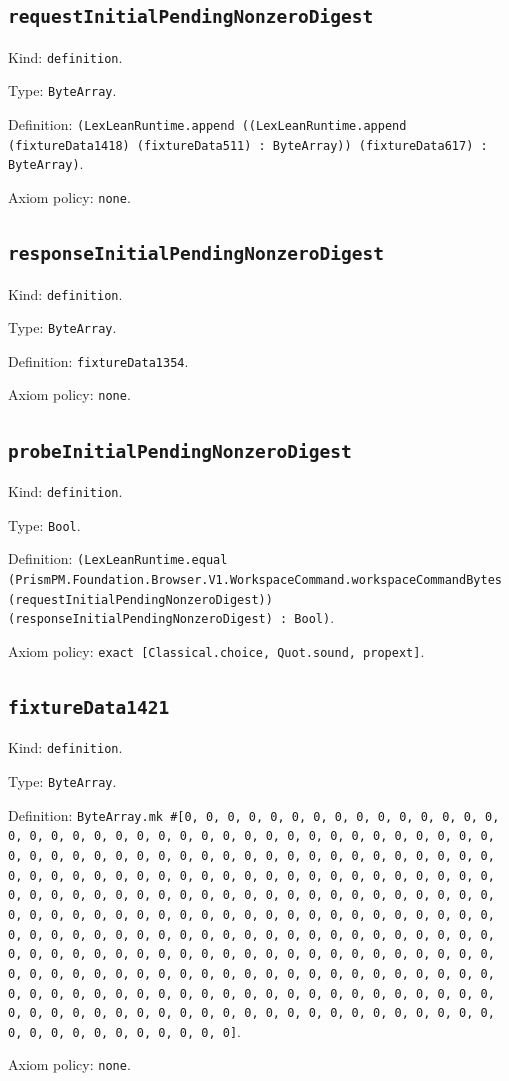 \documentclass[11pt]{article}
\begin{document}
\subsection*{\texttt{requestInitialPendingNonzeroDigest}}
\noindent Kind: \texttt{definition}.\par
\noindent Type: \texttt{ByteArray}.\par
\noindent Definition: \texttt{(LexLeanRuntime.append ((LexLeanRuntime.append (fixtureData1418) (fixtureData511) : ByteArray)) (fixtureData617) : ByteArray)}.\par
\noindent Axiom policy: \texttt{none}.\par
\subsection*{\texttt{responseInitialPendingNonzeroDigest}}
\noindent Kind: \texttt{definition}.\par
\noindent Type: \texttt{ByteArray}.\par
\noindent Definition: \texttt{fixtureData1354}.\par
\noindent Axiom policy: \texttt{none}.\par
\subsection*{\texttt{probeInitialPendingNonzeroDigest}}
\noindent Kind: \texttt{definition}.\par
\noindent Type: \texttt{Bool}.\par
\noindent Definition: \texttt{(LexLeanRuntime.equal (PrismPM.Foundation.Browser.V1.WorkspaceCommand.workspaceCommandBytes (requestInitialPendingNonzeroDigest)) (responseInitialPendingNonzeroDigest) : Bool)}.\par
\noindent Axiom policy: \texttt{exact [Classical.choice, Quot.sound, propext]}.\par
\subsection*{\texttt{fixtureData1421}}
\noindent Kind: \texttt{definition}.\par
\noindent Type: \texttt{ByteArray}.\par
\noindent Definition: \texttt{ByteArray.mk \#[0, 0, 0, 0, 0, 0, 0, 0, 0, 0, 0, 0, 0, 0, 0, 0, 0, 0, 0, 0, 0, 0, 0, 0, 0, 0, 0, 0, 0, 0, 0, 0, 0, 0, 0, 0, 0, 0, 0, 0, 0, 0, 0, 0, 0, 0, 0, 0, 0, 0, 0, 0, 0, 0, 0, 0, 0, 0, 0, 0, 0, 0, 0, 0, 0, 0, 0, 0, 0, 0, 0, 0, 0, 0, 0, 0, 0, 0, 0, 0, 0, 0, 0, 0, 0, 0, 0, 0, 0, 0, 0, 0, 0, 0, 0, 0, 0, 0, 0, 0, 0, 0, 0, 0, 0, 0, 0, 0, 0, 0, 0, 0, 0, 0, 0, 0, 0, 0, 0, 0, 0, 0, 0, 0, 0, 0, 0, 0, 0, 0, 0, 0, 0, 0, 0, 0, 0, 0, 0, 0, 0, 0, 0, 0, 0, 0, 0, 0, 0, 0, 0, 0, 0, 0, 0, 0, 0, 0, 0, 0, 0, 0, 0, 0, 0, 0, 0, 0, 0, 0, 0, 0, 0, 0, 0, 0, 0, 0, 0, 0, 0, 0, 0, 0, 0, 0, 0, 0, 0, 0, 0, 0, 0, 0, 0, 0, 0, 0, 0, 0, 0, 0, 0, 0, 0, 0, 0, 0, 0, 0, 0, 0, 0, 0, 0, 0, 0, 0, 0, 0, 0, 0, 0, 0, 0, 0, 0, 0, 0, 0, 0, 0, 0, 0, 0, 0, 0, 0, 0, 0, 0, 0, 0, 0, 0, 0, 0, 0, 0, 0, 0, 0, 0, 0, 0, 0]}.\par
\noindent Axiom policy: \texttt{none}.\par
\end{document}
